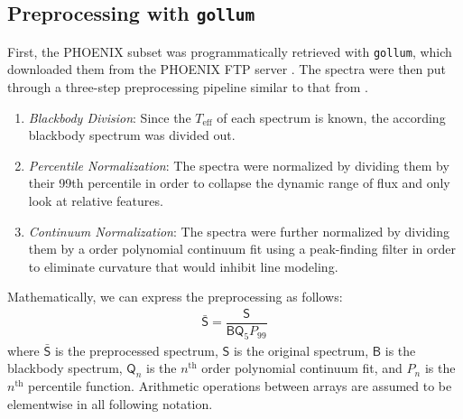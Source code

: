 \documentclass[twocolumn]{aastex631}
\begin{document}
\subsection{Preprocessing with \texttt{gollum}}
First, the PHOENIX subset was programmatically retrieved with \texttt{gollum}, which downloaded them from the PHOENIX FTP server \citep{gollum}. The spectra were then put through a 
three-step preprocessing pipeline similar to that from \citealt{blase}.
\begin{enumerate}
    \item \textit{Blackbody Division}: Since the $T_{\mathrm{eff}}$ of each spectrum is known, the according blackbody spectrum was divided out.
    \item \textit{Percentile Normalization}: The spectra were normalized by dividing them by their 99th percentile in order to collapse the dynamic range of flux and only look at relative features.
    \item \textit{Continuum Normalization}: The spectra were further normalized by dividing them by a  order polynomial continuum fit using a peak-finding filter in order to eliminate curvature that would inhibit line modeling.
\end{enumerate}
Mathematically, we can express the preprocessing as follows:
\begin{gather}
    \mathsf{\bar{S}} = \dfrac{\mathsf{S}}{\mathsf{B}\mathsf{Q}_5P_{99}}
\end{gather}
where $\mathsf{\bar{S}}$ is the preprocessed spectrum, $\mathsf{S}$ is the original spectrum,  $\mathsf{B}$ is the blackbody spectrum, $\mathsf{Q}_n$ is the $n^\mathrm{th}$ order polynomial continuum fit, and $P_n$ is the $n^\mathrm{th}$ percentile function. 
Arithmetic operations between arrays are assumed to be elementwise in all following notation.
\end{document}
